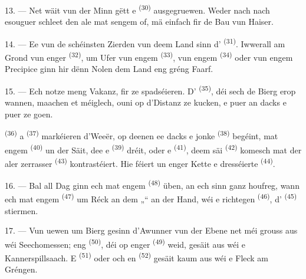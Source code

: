 13. --- Net wäit vun der Minn gëtt e  \textsuperscript{(30)}
ausgegruewen. Weder  nach  nach esouguer
 schleet den ale  mat sengem 
of, mä einfach  fir de Bau vun Haiser.

14. --- Ee vun de schéinsten Zierden vun deem Land sinn d'
\textsuperscript{(31)}. Iwwerall am Grond vun enger 
\textsuperscript{(32)}, um Ufer vun engem  \textsuperscript{(33)},
vun engem  \textsuperscript{(34)} oder vun engem Precipice ginn hir
dënn Nolen dem Land eng gréng Faarf.

\VUsaut{3.0mm}
\VUsaut{3.0mm}

15. --- Ech notze meng Vakanz, fir  ze spadséieren. D'
\textsuperscript{(35)}, déi sech de Bierg erop wannen, maachen et méiglech, ouni op
d'Distanz ze kucken, e puer  an dacks e puer  ze goen.

 \textsuperscript{(36)} a  \textsuperscript{(37)}
markéieren d'Weeër, op deenen ee dacks e jonke 
\textsuperscript{(38)} begéint, mat engem  \textsuperscript{(40)} un
der Säit, dee e  \textsuperscript{(39)} dréit, oder e
 \textsuperscript{(41)}, deem säi 
\textsuperscript{(42)} komesch mat der aler zerrasser 
\textsuperscript{(43)} kontrastéiert. Hie féiert un enger Kette e dresséierte
 \textsuperscript{(44)}.

\VUsaut{3.0mm}

16. --- Bal all Dag ginn ech mat engem  \textsuperscript{(48)}
 üben, an ech sinn ganz houfreg, wann ech mat engem 
\textsuperscript{(47)} um Réck an dem „“ an der Hand, wéi e
richtegen  \textsuperscript{(46)}, d'
\textsuperscript{(45)} stiermen.

17. --- Vun uewen um Bierg gesinn d'Awunner vun der Ebene net méi grouss aus wéi
Seechomessen; eng  \textsuperscript{(50)}, déi op enger
 \textsuperscript{(49)} weid, gesäit aus wéi e Kannerspillsaach. E
 \textsuperscript{(51)} oder och en 
\textsuperscript{(52)} gesäit kaum aus wéi e Fleck am Gréngen.

